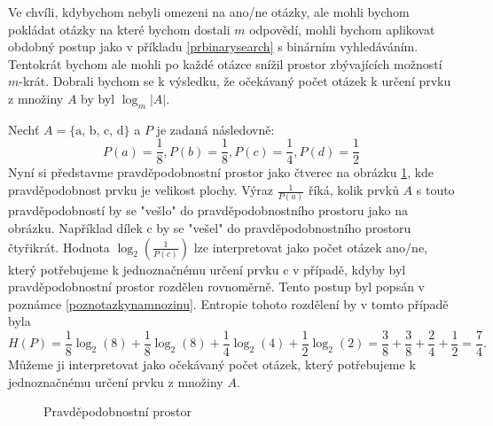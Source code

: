 \begin{prikl}[m odpovědí]\label{prmodpovedi}
    Ve chvíli, kdybychom nebyli omezeni na ano/ne otázky, ale mohli bychom pokládat otázky na které bychom dostali $m$ odpovědí, mohli bychom aplikovat obdobný postup jako v příkladu \ref{prbinarysearch} s binárním vyhledáváním. Tentokrát bychom ale mohli po každé otázce snížil prostor zbývajících možností $m$-krát. Dobrali bychom se k výsledku, že očekávaný počet otázek k určení prvku z množiny $A$ by byl $\log_m |A|$.
\end{prikl}

\begin{prikl}\label{prentropierozdeleni}
Nechť $A = \{ \text{a, b, c, d}\}$ a $P$ je zadaná následovně: 
\[P(a) = \frac{1}{8}, P(b) = \frac{1}{8}, P(c) = \frac{1}{4}, P(d) = \frac{1}{2}\]
Nyní si představme pravděpodobnostní prostor jako čtverec na obrázku \ref{prprostor}, kde pravděpodobnost prvku je velikost plochy. Výraz $\frac{1}{P(a)}$ říká, kolik prvků $A$ s touto pravděpodobností by se "vešlo" do pravděpodobnostního prostoru jako na obrázku. Například dílek c by se "vešel" do pravděpodobnostního prostoru čtyřikrát.
Hodnota $\log_2\left(\frac{1}{P(c)}\right)$ lze interpretovat jako počet otázek ano/ne, který potřebujeme k jednoznačnému určení prvku c v případě, kdyby byl pravděpodobnostní prostor rozdělen rovnoměrně. Tento postup byl popsán 
v poznámce \ref{poznotazkynamnozinu}.
Entropie tohoto rozdělení by v tomto případě byla 
\[H(P) = \frac{1}{8}\log_2 (8) + \frac{1}{8}\log_2 (8) + \frac{1}{4}\log_2 (4) + \frac{1}{2}\log_2 (2) = \frac{3}{8} + \frac{3}{8} + \frac{2}{4} + \frac{1}{2} = \frac{7}{4}.\]
Můžeme ji interpretovat jako očekávaný počet otázek, který potřebujeme k jednoznačnému určení prvku z množiny $A$. 


\begin{figure}
\caption{Pravděpodobnostní prostor}
\label{prprostor}
\end{figure}

\end{prikl}

